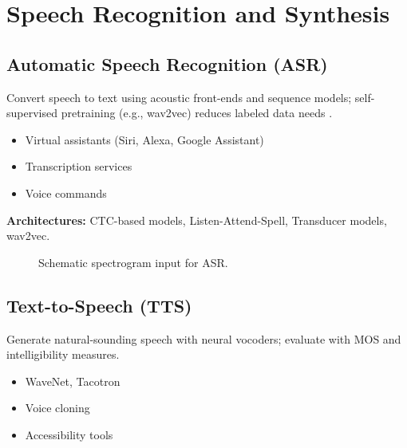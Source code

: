
\section{Speech Recognition and Synthesis }
\label{sec:speech-applications}

\subsection{Automatic Speech Recognition (ASR)}

Convert speech to text using acoustic front-ends and sequence models; self-supervised pretraining (e.g., wav2vec) reduces labeled data needs \textcite{Prince2023}.
\begin{itemize}
    \item Virtual assistants (Siri, Alexa, Google Assistant)
    \item Transcription services
    \item Voice commands
\end{itemize}

\textbf{Architectures:} CTC-based models, Listen-Attend-Spell, Transducer models, wav2vec.

\begin{figure}[h]
  \centering
  \caption{Schematic spectrogram input for ASR.}
  \label{fig:asr-spec}
\end{figure}

\subsection{Text-to-Speech (TTS)}

Generate natural-sounding speech with neural vocoders; evaluate with MOS and intelligibility measures.
\begin{itemize}
    \item WaveNet, Tacotron
    \item Voice cloning
    \item Accessibility tools
\end{itemize}

